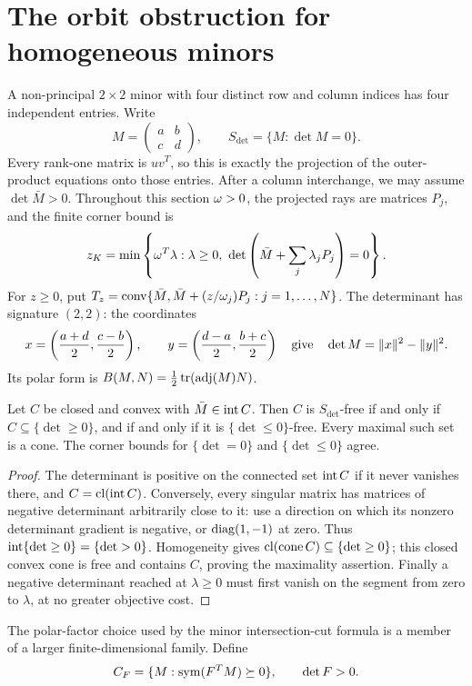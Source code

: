 \section{The orbit obstruction for homogeneous minors}\label{mi:section}

A non-principal $2\times2$ minor with four distinct row and column indices
has four independent entries. Write
\[
 M=\begin{pmatrix}a&b\\c&d\end{pmatrix},\qquad
 S_{\det}=\{M:\det M=0\}.
\]
Every rank-one matrix is $uv^T$, so this is exactly the projection of the
outer-product equations onto those entries. After a column interchange,
we may assume $\det\bar M>0$. Throughout this section $\omega>0$, the projected
rays are matrices $P_j$, and the finite corner bound is
\[
 z_K=\min\left\{\omega^T\lambda:
       \lambda\ge0,\ \det\left(\bar M+\sum_j\lambda_jP_j\right)=0\right\}.
\]
For $z\ge0$, put
$T_z=\operatorname{conv}\{\bar M,\bar M+(z/\omega_j)P_j:j=1,\ldots,N\}$.
The determinant has signature $(2,2)$: the coordinates
\[
 x=\left(\frac{a+d}{2},\frac{c-b}{2}\right),\qquad
 y=\left(\frac{d-a}{2},\frac{b+c}{2}\right)
 \quad\hbox{give}\quad \det M=\lVert x\rVert^2-\lVert y\rVert^2.
\]
Its polar form is $B(M,N)=\tfrac12\operatorname{tr}(\operatorname{adj}(M)N)$.

\begin{lemma}\label{mi:free-cones}
Let $C$ be closed and convex with $\bar M\in\operatorname{int} C$.
Then $C$ is $S_{\det}$-free if and only if $C\subseteq\{\det\ge0\}$,
and if and only if it is $\{\det\le0\}$-free. Every maximal such set is
a cone. The corner bounds for $\{\det=0\}$ and $\{\det\le0\}$ agree.
\end{lemma}
\begin{proof}
The determinant is positive on the connected set $\operatorname{int} C$ if it never
vanishes there, and $C=\operatorname{cl}(\operatorname{int} C)$. Conversely, every singular matrix
has matrices of negative determinant arbitrarily close to it: use a
direction on which its nonzero determinant gradient is negative, or
$\operatorname{diag}(1,-1)$ at zero. Thus $\operatorname{int}\{\det\ge0\}=\{\det>0\}$.
Homogeneity gives $\operatorname{cl}(\operatorname{cone} C)\subseteq\{\det\ge0\}$; this closed convex
cone is free and contains $C$, proving the maximality assertion.
Finally a negative determinant reached at $\lambda\ge0$ must first vanish
on the segment from zero to $\lambda$, at no greater objective cost.
\end{proof}

The polar-factor choice used by the minor intersection-cut formula
\citep{BCM2020,ChmielaMunozSerrano2020ZIB} is a member of a larger finite-dimensional family.
Define
\[
 C_F=\{M:\operatorname{sym}(F^TM)\succeq0\},\qquad \det F>0.
\]

